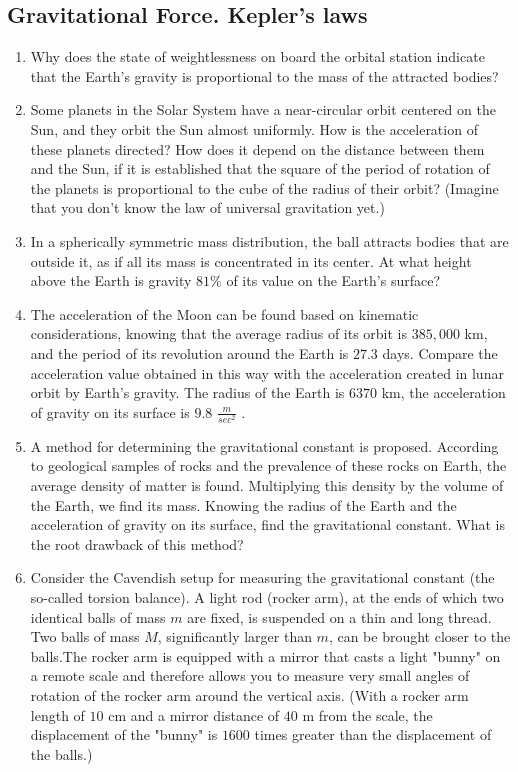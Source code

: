 \documentclass{article}
\begin{document}
\subsection{Gravitational Force. Kepler's laws}

\begin{enumerate}[label=2.6.\arabic*]

\item Why does the state of weightlessness on board the orbital station indicate that the Earth's gravity is proportional to the mass of the attracted bodies?

\item Some planets in the Solar System have a near-circular orbit centered on the Sun, and they orbit the Sun almost uniformly. How is the acceleration of these planets directed? How does it depend on the distance between them and the Sun, if it is established that the square of the period of rotation of the planets is proportional to the cube of the radius of their orbit? (Imagine that you don't know the law of universal gravitation yet.)

\item In a spherically symmetric mass distribution, the ball attracts bodies that are outside it, as if all its mass is concentrated in its center. At what height above the Earth is gravity $81 \%$ of its value on the Earth's surface?

\item The acceleration of the Moon can be found based on kinematic considerations, knowing that the average radius of its orbit is $385,000$ km, and the period of its revolution around the Earth is $27.3$ days. Compare the acceleration value obtained in this way with the acceleration created in lunar orbit by Earth's gravity. The radius of the Earth is $6370$ km, the acceleration of gravity on its surface is $9.8$ $\frac{m}{sec^2}$ .

\item A method for determining the gravitational constant is proposed. According to geological samples of rocks and the prevalence of these rocks on Earth, the average density of matter is found. Multiplying this density by the volume of the Earth, we find its mass. Knowing the radius of the Earth and the acceleration of gravity on its surface, find the gravitational constant. What is the root drawback of this method?

\item Consider the Cavendish setup for measuring the gravitational constant (the so-called torsion balance). A light rod (rocker arm), at the ends of which two identical balls of mass $m$ are fixed, is suspended on a thin and long thread. Two balls of mass $M$, significantly larger than $m$, can be brought closer to the balls.The rocker arm is equipped with a mirror that casts a light "bunny" on a remote scale and therefore allows you to measure very small angles of rotation of the rocker arm around the vertical axis. (With a rocker arm length of $10$ cm and a mirror distance of $40$ m from the scale, the displacement of the "bunny" is $1600$ times greater than the displacement of the balls.) 


\end{enumerate}
\end{document}
